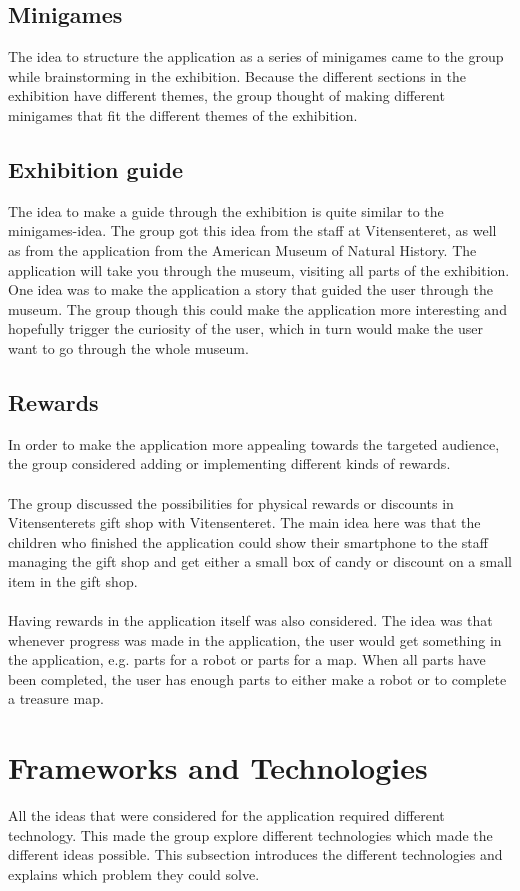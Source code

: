 \subsection{Minigames}
The idea to structure the application as a series of minigames came to the group while brainstorming in the exhibition. Because the different sections in the exhibition have different themes, the group thought of making different minigames that fit the different themes of the exhibition. 

\subsection{Exhibition guide}
The idea to make a guide through the exhibition is quite similar to the minigames-idea. The group got this idea from the staff at Vitensenteret, as well as from the application from the American Museum of Natural History. The application will take you through the museum, visiting all parts of the exhibition. One idea was to make the application a story that guided the user through the museum. The group though this could make the application more interesting and hopefully trigger the curiosity of the user, which in turn would make the user want to go through the whole museum.

\subsection{Rewards}
In order to make the application more appealing towards the targeted audience, the group considered adding or implementing different kinds of rewards.\\
\\
The group discussed the possibilities for physical rewards or discounts in Vitensenterets gift shop with Vitensenteret. The main idea here was that the children who finished the application could show their smartphone to the staff managing the gift shop and get either a small box of candy or discount on a small item in the gift shop.\\
\\
Having rewards in the application itself was also considered. The idea was that whenever progress was made in the application, the user would get something in the application, e.g. parts for a robot or parts for a map. When all parts have been completed, the user has enough parts to either make a robot or to complete a treasure map.

\section{Frameworks and Technologies}
All the ideas that were considered for the application required different technology. This made the group explore different technologies which made the different ideas possible. This subsection introduces the different technologies and explains which problem they could solve.

